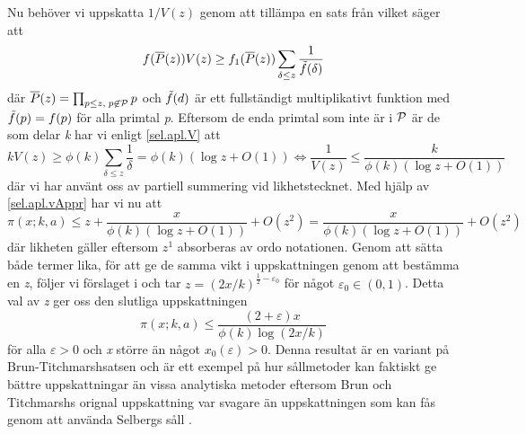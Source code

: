 Nu behöver vi uppskatta \(1/V(z)\) genom att tillämpa en sats från \cite[Kap. 7]{cojocarumurty} vilket säger att
\begin{equation}
    f(\overline{P}(z))V(z) \geq f_1(\overline{P}(z))\sum_{\delta \leq z}\frac{1}{\Tilde{f}(\delta)}\label{sel.apl.V}
\end{equation}
där \(\overline{P}(z) = \prod_{p\leq z,\; p \not \in \P}p\) och \(\Tilde{f}(d)\) är ett fullständigt multiplikativt funktion med \(\Tilde{f}(p) = f(p)\) för alla primtal \textit{p}. 
Eftersom de enda primtal som inte är i \(\P\) är de som delar \textit{k} har vi enligt \eqref{sel.apl.V} att 
\begin{equation}
    kV(z) \geq \phi(k) \sum_{\delta \leq z}\frac{1}{\delta} = \phi(k)(\log z + O(1)) \iff \frac{1}{V(z)} \leq \frac{k}{\phi(k)(\log z + O(1))}\label{sel.apl.vAppr}
\end{equation}
där vi har använt oss av partiell summering vid likhetstecknet. 
Med hjälp av \eqref{sel.apl.vAppr} har vi nu att
\begin{equation}
     \pi(x;k,a) \leq z + \frac{x}{\phi(k)(\log z + O(1))} + O(z^2) = \frac{x}{\phi(k)(\log z + O(1))} + O(z^2)\nonumber
\end{equation}
där likheten gäller eftersom \(z^1\) absorberas av ordo notationen. 
Genom att sätta både termer lika, för att ge de samma vikt i uppskattningen genom att bestämma en \textit{z}, följer vi förslaget i \cite{cojocarumurty} och tar \(z = (2x/k)^{\frac{1}{2}-\varepsilon_0}\) för något \(\varepsilon_0\in(0, 1)\). Detta val av \textit{z} ger oss den slutliga uppskattningen
\begin{equation}
    \pi(x;k,a) \leq \frac{(2+\varepsilon)x}{\phi(k)\log(2x/k)}\nonumber
\end{equation}
för alla \(\varepsilon > 0\) och \textit{x} större än något \(x_0(\varepsilon) >0\). 
Denna resultat är en variant på Brun-Titchmarshsatsen och är ett exempel på hur sållmetoder kan faktiskt ge bättre uppskattningar än vissa analytiska metoder eftersom Brun och Titchmarshs orignal uppskattning var svagare än uppskattningen som kan fås genom att använda Selbergs såll \cite{BrunTitch}.